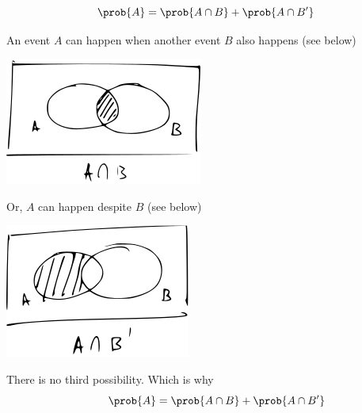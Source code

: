\documentclass[14pt,fleqn]{extarticle}
\begin{document}
 
\begin{snippet}
    \correct
    
    \[ \prob{A} = \prob{A\cap B} + \prob{A\cap B'} \]
    
    \reason
    
    An event $A$ can happen when another event $B$ also happens (see below) 
    \begin{center}
\includegraphics[scale=1.4]{97-A.svg}
\end{center}

Or, $A$ can happen despite $B$ (see below) 
\begin{center}
\includegraphics[scale=1.4]{97-B.svg}
\end{center}

There is no third possibility. Which is why 
\[ \qquad \prob{A} = \prob{A\cap B} + \prob{A\cap B'} \]
\end{snippet} 
\end{document}
